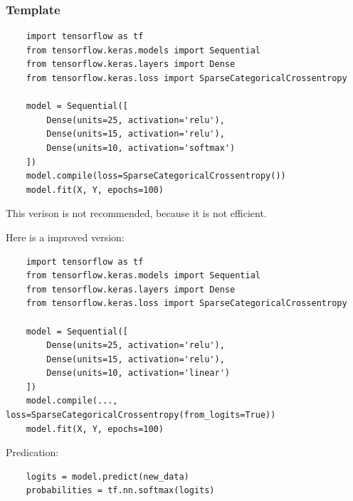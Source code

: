 \subsubsection*{Template}
\begin{verbatim}
    import tensorflow as tf
    from tensorflow.keras.models import Sequential
    from tensorflow.keras.layers import Dense
    from tensorflow.keras.loss import SparseCategoricalCrossentropy

    model = Sequential([
        Dense(units=25, activation='relu'),
        Dense(units=15, activation='relu'),
        Dense(units=10, activation='softmax')
    ])
    model.compile(loss=SparseCategoricalCrossentropy())
    model.fit(X, Y, epochs=100)
\end{verbatim}
This verison is not recommended, because it is not efficient.\par
Here is a improved version:
\begin{verbatim}
    import tensorflow as tf
    from tensorflow.keras.models import Sequential
    from tensorflow.keras.layers import Dense
    from tensorflow.keras.loss import SparseCategoricalCrossentropy

    model = Sequential([
        Dense(units=25, activation='relu'),
        Dense(units=15, activation='relu'),
        Dense(units=10, activation='linear')
    ])
    model.compile(..., loss=SparseCategoricalCrossentropy(from_logits=True))
    model.fit(X, Y, epochs=100)
\end{verbatim}
\par
Predication:
\begin{verbatim}
    logits = model.predict(new_data)
    probabilities = tf.nn.softmax(logits)
\end{verbatim}

